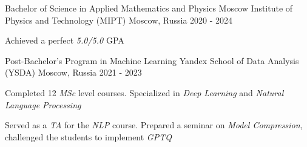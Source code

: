 
\begin{cventries}
  \cventry
    {Bachelor of Science in Applied Mathematics and Physics} %
    {Moscow Institute of Physics and Technology (MIPT)} %
    {Moscow, Russia} %
    {2020 - 2024} %
    {
        \begin{cvitems}
         \item { Achieved a perfect \textit{5.0/5.0} GPA }
        \end{cvitems}
    }
    
  \cventry
    {Post-Bachelor's Program in Machine Learning} %
    {Yandex School of Data Analysis (YSDA)}
    {Moscow, Russia}
    {2021 - 2023}
    {
      \begin{cvitems} %
        \item { Completed 12 \textit{MSc} level courses. Specialized in \textit{Deep Learning} and \textit{Natural Language Processing} }
        \item { Served as a \textit{TA} for the \textit{NLP} course. Prepared a seminar on \textit{Model Compression}, challenged the students to implement \textit{GPTQ} }
      \end{cvitems}
    }
\end{cventries}
